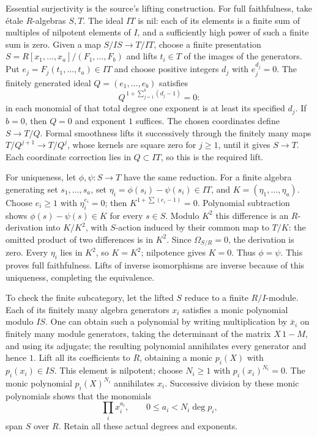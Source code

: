 Essential surjectivity is the source's lifting construction. For full faithfulness, take étale \(R\)-algebras \(S,T\). The ideal \(IT\) is nil: each of its elements is a finite sum of multiples of nilpotent elements of \(I\), and a sufficiently high power of such a finite sum is zero. Given a map \(S/IS\to T/IT\), choose a finite presentation \(S=R[x_1,\ldots,x_a]/(F_1,\ldots,F_b)\) and lifts \(t_i\in T\) of the images of the generators. Put \(e_j=F_j(t_1,\ldots,t_a)\in IT\) and choose positive integers \(d_j\) with \(e_j^{d_j}=0\). The finitely generated ideal \(Q=(e_1,\ldots,e_b)\) satisfies \[
Q^{\,1+\sum_{j=1}^b(d_j-1)}=0:
\] in each monomial of that total degree one exponent is at least its specified \(d_j\). If \(b=0\), then \(Q=0\) and exponent \(1\) suffices. The chosen coordinates define \(S\to T/Q\). Formal smoothness lifts it successively through the finitely many maps \(T/Q^{j+1}\to T/Q^j\), whose kernels are square zero for \(j\ge1\), until it gives \(S\to T\). Each coordinate correction lies in \(Q\subset IT\), so this is the required lift.

For uniqueness, let \(\phi,\psi:S\to T\) have the same reduction. For a finite algebra generating set \(s_1,\ldots,s_a\), set \(\eta_i=\phi(s_i)-\psi(s_i)\in IT\), and \(K=(\eta_1,\ldots,\eta_a)\). Choose \(e_i\ge1\) with \(\eta_i^{e_i}=0\); then \(K^{1+\sum(e_i-1)}=0\). Polynomial subtraction shows \(\phi(s)-\psi(s)\in K\) for every \(s\in S\). Modulo \(K^2\) this difference is an \(R\)-derivation into \(K/K^2\), with \(S\)-action induced by their common map to \(T/K\): the omitted product of two differences is in \(K^2\). Since \(\Omega_{S/R}=0\), the derivation is zero. Every \(\eta_i\) lies in \(K^2\), so \(K=K^2\); nilpotence gives \(K=0\). Thus \(\phi=\psi\). This proves full faithfulness. Lifts of inverse isomorphisms are inverse because of this uniqueness, completing the equivalence.

To check the finite subcategory, let the lifted \(S\) reduce to a finite \(R/I\)-module. Each of its finitely many algebra generators \(x_i\) satisfies a monic polynomial modulo \(IS\). One can obtain such a polynomial by writing multiplication by \(\bar x_i\) on finitely many module generators, taking the determinant of the matrix \(X\,1-M\), and using its adjugate; the resulting polynomial annihilates every generator and hence \(1\). Lift all its coefficients to \(R\), obtaining a monic \(p_i(X)\) with \(p_i(x_i)\in IS\). This element is nilpotent; choose \(N_i\ge1\) with \(p_i(x_i)^{N_i}=0\). The monic polynomial \(p_i(X)^{N_i}\) annihilates \(x_i\). Successive division by these monic polynomials shows that the monomials \[
\prod_i x_i^{a_i},\qquad 0\le a_i<N_i\deg p_i,
\] span \(S\) over \(R\). Retain all these actual degrees and exponents.

